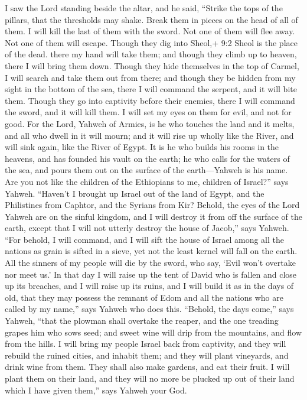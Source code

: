  I saw the Lord standing beside the altar, and he said,
``Strike the tops of the pillars, that the thresholds may shake. Break
them in pieces on the head of all of them. I will kill the last of them
with the sword. Not one of them will flee away. Not one of them will
escape.  Though they dig into Sheol,+ 9:2 Sheol is the place
of the dead. there my hand will take them; and though they climb up to
heaven, there I will bring them down.  Though they hide
themselves in the top of Carmel, I will search and take them out from
there; and though they be hidden from my sight in the bottom of the sea,
there I will command the serpent, and it will bite them. 
Though they go into captivity before their enemies, there I will command
the sword, and it will kill them. I will set my eyes on them for evil,
and not for good.  For the Lord, Yahweh of Armies, is he who
touches the land and it melts, and all who dwell in it will mourn; and
it will rise up wholly like the River, and will sink again, like the
River of Egypt.  It is he who builds his rooms in the
heavens, and has founded his vault on the earth; he who calls for the
waters of the sea, and pours them out on the surface of the
earth---Yahweh is his name.  Are you not like the children
of the Ethiopians to me, children of Israel?'' says Yahweh. ``Haven't I
brought up Israel out of the land of Egypt, and the Philistines from
Caphtor, and the Syrians from Kir?  Behold, the eyes of the
Lord Yahweh are on the sinful kingdom, and I will destroy it from off
the surface of the earth, except that I will not utterly destroy the
house of Jacob,'' says Yahweh.  ``For behold, I will
command, and I will sift the house of Israel among all the nations as
grain is sifted in a sieve, yet not the least kernel will fall on the
earth.  All the sinners of my people will die by the sword,
who say, `Evil won't overtake nor meet us.'  In that day I
will raise up the tent of David who is fallen and close up its breaches,
and I will raise up its ruins, and I will build it as in the days of
old,  that they may possess the remnant of Edom and all the
nations who are called by my name,'' says Yahweh who does this.
 ``Behold, the days come,'' says Yahweh, ``that the plowman
shall overtake the reaper, and the one treading grapes him who sows
seed; and sweet wine will drip from the mountains, and flow from the
hills.  I will bring my people Israel back from captivity,
and they will rebuild the ruined cities, and inhabit them; and they will
plant vineyards, and drink wine from them. They shall also make gardens,
and eat their fruit.  I will plant them on their land, and
they will no more be plucked up out of their land which I have given
them,'' says Yahweh your God.
